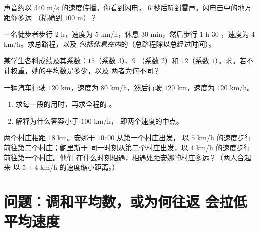 \begin{exercise}[$\star$]\label{exo:g8:speed:7}
声音约以 $340$ m/s 的速度传播。你看到闪电，
$6$ 秒后听到雷声。闪电击中的地方距你多远
（精确到 $100$ m）？
\end{exercise}

\begin{exercise}[$\star\star$]\label{exo:g8:speed:8}
一名徒步者步行 $2$ h，速度为 $5$ km/h，休息 $30$ min，然后步行 $1$ h $30$
，速度为 $4$ km/h。求总路程，以及
\emph{包括休息在内}的（总路程除以总经过时间）。
\end{exercise}

\begin{exercise}[$\star\star$]\label{exo:g8:speed:9}
某学生各科成绩及其系数：$15$（系数 $3$）、$9$
（系数 $2$）和 $12$（系数 $1$）。求。若不计权重，她的平均数是多少，以及
两者为何不同？
\end{exercise}

\begin{exercise}[$\star\star$]\label{exo:g8:speed:10}
一辆汽车行驶 $120$ km，速度为 $80$ km/h，然后行驶 $120$ km，速度为 $120$ km/h。
\begin{enumerate}
  \item 求每一段的用时，再求全程的
        。
  \item 解释为什么答案小于 $100$ km/h，
        即两个速度的中点。
\end{enumerate}
\end{exercise}

\begin{exercise}[$\star\star\star$]\label{exo:g8:speed:11}
两个村庄相距 $18$ km。安娜于 $10{:}00$ 从第一个村庄出发，
以 $5$ km/h 的速度步行前往第二个村庄；鲍里斯于
同一时刻从第二个村庄出发，以 $4$ km/h 的速度步行前往第一个村庄。他们
在什么时刻相遇，相遇处距安娜的村庄多远？（两人合起来
以 $5 + 4$ km/h 的速度缩小距离。）
\end{exercise}

\section{问题：调和平均数，或为何往返
会拉低平均速度}

